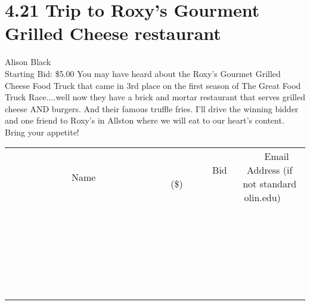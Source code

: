 \documentclass[11pt]{article}
\begin{document}
\section*{4.21 Trip to Roxy's Gourment Grilled Cheese restaurant}
Alison Black
\\
Starting Bid: \$5.00
\newline
You may have heard about the Roxy's Gourmet Grilled Cheese Food Truck that came in 3rd place on the first season of The Great Food Truck Race....well now they have a brick and mortar restaurant that serves grilled cheese AND burgers.  And their famous truffle fries.  I'll drive the winning bidder and one friend to Roxy's in Allston where we will eat to our heart's content. Bring your appetite!
\\[6ex]
\begin{tabular}{c c c}
~~~~~~~~~~~~~Name~~~~~~~~~~~~~ & ~~~~~~~~~Bid (\$)~~~~~~~~~  & ~~~Email Address (if not standard olin.edu)~~~\\
 & & \\
\hline
 & & \\
\hline
 & & \\
\hline
 & & \\
\hline
 & & \\
\hline
 & & \\
\hline
 & & \\
\hline
 & & \\
\hline
 & & \\
\hline
 & & \\
\hline
 & & \\
\hline
 & & \\
\hline
 & & \\
\hline
 & & \\
\hline
 & & \\
\hline
 & & \\
\hline
 & & \\
\hline
 & & \\
\hline
 & & \\
\hline
 & & \\
\hline
 & & \\
\hline
 & & \\
\hline
 & & \\
\hline
 & & \\
\hline
 & & \\
\hline
 & & \\
\hline
\end{tabular}
\newpage
\end{document}
